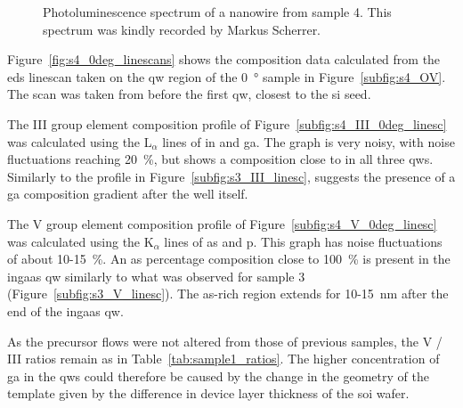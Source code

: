 \begin{figure}
    \centering
    \caption[Photoluminescence spectrum of a nanowire from sample 4.]{Photoluminescence spectrum of a nanowire from sample 4. This spectrum was kindly recorded by Markus Scherrer.}
    \label{fig:s4_pl}
\end{figure}

Figure~\ref{fig:s4_0deg_linescans} shows the composition data calculated from the \acs{eds} linescan taken on the \acl{qw} region of the \qty{0}{\degree} sample in Figure~\ref{subfig:s4_OV}. The scan was taken from before the first \acl{qw}, closest to the \acl{si} seed.

The III group element composition profile of Figure~\ref{subfig:s4_III_0deg_linesc} was calculated using the L\(_\alpha\) lines of \acl{in} and \acl{ga}. The graph is very noisy, with noise fluctuations reaching \qty{20}{\%}, but shows a composition close to  in all three \acl{qw}s. Similarly to the profile in Figure~\ref{subfig:s3_III_linesc}, suggests the presence of a \acl{ga} composition gradient after the well itself. 

The V group element composition profile of Figure~\ref{subfig:s4_V_0deg_linesc} was calculated using the K\(_\alpha\) lines of \acl{as} and \acl{p}. This graph has noise fluctuations of about \num{10}-\qty{15}{\%}. An \acl{as} percentage composition close to \qty{100}{\%} is present in the \acs{ingaas} \acl{qw} similarly to what was observed for sample 3 (Figure~\ref{subfig:s3_V_linesc}). The \acs{as}-rich region extends for \num{10}-\qty{15}{\nano\metre} after the end of the \acs{ingaas} \acl{qw}.

As the precursor flows were not altered from those of previous samples, the V / III ratios remain as in Table~\ref{tab:sample1_ratios}. The higher concentration of \acl{ga} in the \acl{qw}s could therefore be caused by the change in the geometry of the template given by the difference in device layer thickness of the  \acs{soi} wafer.

